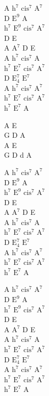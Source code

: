\begin{chordw}
    A $\mathrm{h^{7}}$ $\mathrm{cis^{7}}$ $\mathrm{A^{7}}$\\
    D $\mathrm{E^{9}}$ A\\
    $\mathrm{h^{7}}$ $\mathrm{E^{9}}$ $\mathrm{cis^{7}}$ $\mathrm{A^{7}}$\\
    D E\\
    A $\mathrm{A^{7}}$ D E\\
    A $\mathrm{h^{7}}$ $\mathrm{cis^{7}}$ A\\
    $\mathrm{h^{7}}$ $\mathrm{E^{7}}$ $\mathrm{cis^{7}}$ $\mathrm{A^{7}}$\\
    D $\mathrm{E_4^{7}}$ $\mathrm{E^{7}}$\\
    A $\mathrm{h^{7}}$ $\mathrm{cis^{7}}$ $\mathrm{A^{7}}$\\
    $\mathrm{h^{7}}$ $\mathrm{E^{7}}$ $\mathrm{cis^{7}}$ $\mathrm{A^{7}}$\\
    $\mathrm{h^{7}}$ $\mathrm{E^{7}}$ A

    A E\\
    G D A\\
    A E\\
    G D d A

    A $\mathrm{h^{7}}$ $\mathrm{cis^{7}}$ $\mathrm{A^{7}}$\\
    D $\mathrm{E^{9}}$ A\\
    $\mathrm{h^{7}}$ $\mathrm{E^{9}}$ $\mathrm{cis^{7}}$ $\mathrm{A^{7}}$\\
    D E\\
    A $\mathrm{A^{7}}$ D E\\
    A $\mathrm{h^{7}}$ $\mathrm{cis^{7}}$ A\\
    $\mathrm{h^{7}}$ $\mathrm{E^{7}}$ $\mathrm{cis^{7}}$ $\mathrm{A^{7}}$\\
    D $\mathrm{E_4^{7}}$ $\mathrm{E^{7}}$\\
    A $\mathrm{h^{7}}$ $\mathrm{cis^{7}}$ $\mathrm{A^{7}}$\\
    $\mathrm{h^{7}}$ $\mathrm{E^{7}}$ $\mathrm{cis^{7}}$ $\mathrm{A^{7}}$\\
    $\mathrm{h^{7}}$ $\mathrm{E^{7}}$ A

    A $\mathrm{h^{7}}$ $\mathrm{cis^{7}}$ $\mathrm{A^{7}}$\\
    D $\mathrm{E^{9}}$ A\\
    $\mathrm{h^{7}}$ $\mathrm{E^{9}}$ $\mathrm{cis^{7}}$ $\mathrm{A^{7}}$\\
    D E\\
    A $\mathrm{A^{7}}$ D E\\
    A $\mathrm{h^{7}}$ $\mathrm{cis^{7}}$ A\\
    $\mathrm{h^{7}}$ $\mathrm{E^{7}}$ $\mathrm{cis^{7}}$ $\mathrm{A^{7}}$\\
    D $\mathrm{E_4^{7}}$ $\mathrm{E^{7}}$\\
    A $\mathrm{h^{7}}$ $\mathrm{cis^{7}}$ $\mathrm{A^{7}}$\\
    $\mathrm{h^{7}}$ $\mathrm{E^{7}}$ $\mathrm{cis^{7}}$ $\mathrm{A^{7}}$\\
    $\mathrm{h^{7}}$ $\mathrm{E^{7}}$ A
\end{chordw}
